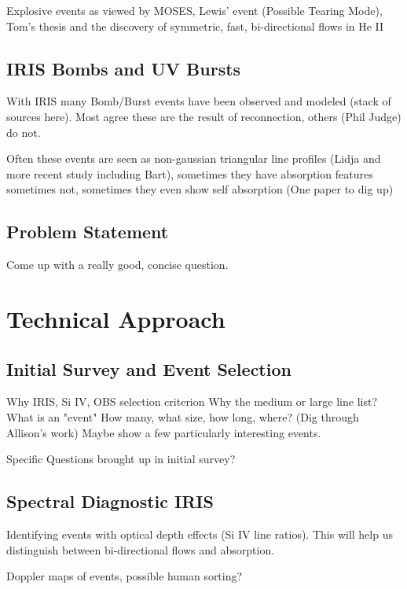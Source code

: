 \documentclass[]{aastex6}
\begin{document}
	
	Explosive events as viewed by MOSES, Lewis' event (Possible Tearing Mode), Tom's thesis and the discovery of symmetric, fast, bi-directional flows in He II
	
	\subsection{IRIS Bombs and UV Bursts}
	With IRIS many Bomb/Burst events have been observed and modeled (stack of sources here).  Most agree these are the result of reconnection, others (Phil Judge) do not.  
	
	Often these events are seen as non-gaussian triangular line profiles (Lidja and more recent study including Bart), sometimes they have absorption features sometimes not, sometimes they even show self absorption (One paper to dig up)
	
	\subsection{Problem Statement} 
	Come up with a really good, concise question.
	
	

\section{Technical Approach} 

	\subsection{Initial Survey and Event Selection}
	Why IRIS, Si IV, OBS selection criterion
	Why the medium or large line list?
	What is an "event"
	How many, what size, how long, where? (Dig through Allison's work)
	Maybe show a few particularly interesting events.
	
	Specific Questions brought up in initial survey?
	
	\subsection{Spectral Diagnostic IRIS}
	Identifying events with optical depth effects (Si IV line ratios). This will help us distinguish between bi-directional flows and absorption.
	
	Doppler maps of events, possible human sorting?
	
\end{document}
